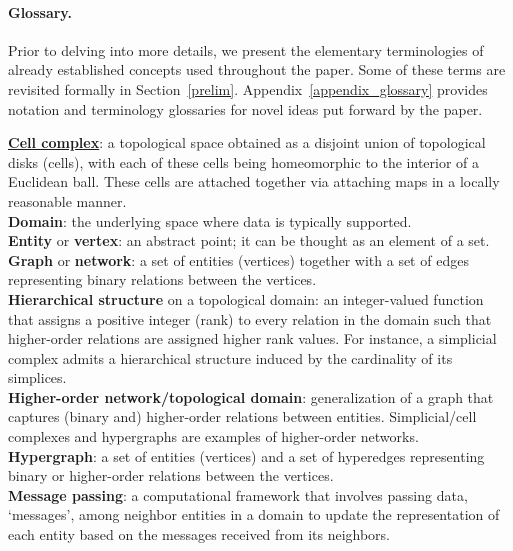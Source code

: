 \paragraph{Glossary.} Prior to delving into more details, we present the elementary terminologies of already established concepts used throughout the paper. Some of these terms are revisited formally in Section~\ref{prelim}. Appendix~\ref{appendix_glossary} provides notation and terminology glossaries for novel ideas put forward by the paper.

\vspace{-0.5mm}
\begin{tcolorbox}
\textbf{\href{https://app.vectary.com/p/3EBiRiJcYjFNvkbbWszQ0Z}{Cell complex}}\label{SX.term}: a topological space obtained as a disjoint union of topological disks (cells), with each of these cells being homeomorphic to the interior of a Euclidean ball. These cells are attached together via attaching maps in a locally reasonable manner. \\[1mm]
\textbf{Domain}\label{domain.term}: the underlying space where data is typically supported.\\[1mm]
\textbf{Entity} or \textbf{vertex}\label{entity.term}: an abstract point; it can be thought as an element of a set.\\[1mm]
\textbf{Graph} or \textbf{network}\label{G.term}: a set of entities (vertices) together with a set of edges representing binary relations between the vertices.\\[1mm]
\textbf{Hierarchical structure} on a topological domain: an integer-valued function that assigns a positive integer (rank) to every relation in the domain such that higher-order relations are assigned higher rank values. For instance, a simplicial complex admits a hierarchical structure induced by the cardinality of its simplices.\\[1mm]
\textbf{Higher-order network/topological domain}: generalization of a graph that captures (binary and) higher-order relations between entities. Simplicial/cell complexes and hypergraphs
are examples of higher-order networks.\\[1mm]
\textbf{Hypergraph}: a set of entities (vertices) and a set of hyperedges representing binary or higher-order relations between the vertices.\\[1mm]
\textbf{Message passing}: a computational framework that involves passing data, `messages', among neighbor entities in a domain to update the representation of each entity based on the messages received from its neighbors.\\[1mm]

\end{tcolorbox}
